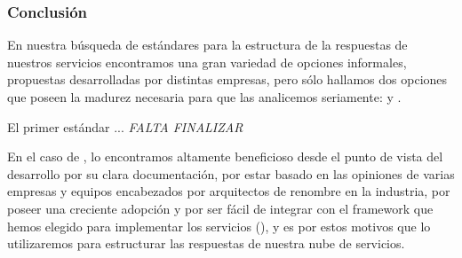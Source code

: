 \subsubsection{Conclusión}

En nuestra búsqueda de estándares para la estructura de la respuestas de nuestros servicios encontramos una gran variedad de opciones informales, propuestas desarrolladas por distintas empresas, pero sólo hallamos dos opciones que poseen la madurez necesaria para que las analicemos seriamente:  y .

El primer estándar ... \textit{FALTA FINALIZAR} 

En el caso de , lo encontramos altamente beneficioso desde el punto de vista del desarrollo por su clara documentación, por estar basado en las opiniones de varias empresas y equipos encabezados por arquitectos de renombre en la industria, por poseer una creciente adopción y por ser fácil de integrar con el framework que hemos elegido para implementar los servicios (), y es por estos motivos que lo utilizaremos para estructurar las respuestas de nuestra nube de servicios.
